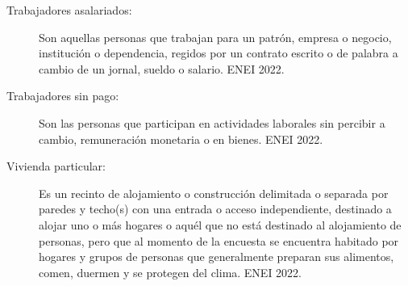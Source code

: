 \begin{description}
	\item[Trabajadores asalariados:] Son aquellas personas que trabajan para un patrón, empresa o negocio, institución o dependencia, regidos por un contrato escrito o de palabra a cambio de un jornal, sueldo o salario. ENEI 2022.
	\item[Trabajadores sin pago:] Son las personas que participan en actividades laborales sin percibir a cambio, remuneración monetaria o en bienes. ENEI 2022.
	\item[Vivienda particular:] Es un recinto de alojamiento o construcción delimitada o separada por paredes y techo(s) con una entrada o acceso independiente, destinado a alojar uno o más hogares o aquél que no está destinado al alojamiento de personas, pero que al momento de la encuesta se encuentra habitado por hogares y grupos de personas que generalmente preparan sus alimentos, comen, duermen y se protegen del clima. ENEI 2022.
	

\end{description}
